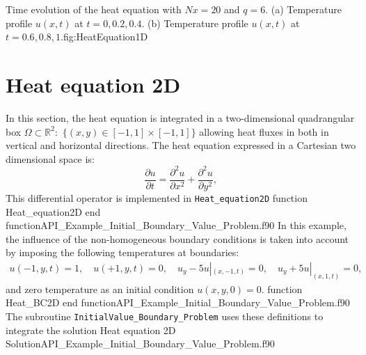 \twographs
{}
{}
{Time evolution of the heat equation with $ Nx = 20$ and  $q=6$. (a) Temperature profile $u(x,t)$ at $t=0, 0.2, 0.4$. (b) Temperature profile $u(x,t)$ at $t=0.6, 0.8, 1$.}{fig:HeatEquation1D}
   
      
  
\newpage      
\section{Heat equation 2D}
\vspace{-0.1cm}
In this section, the heat equation is integrated in a two-dimensional quadrangular box   $\Omega \subset \mathbb{R}^2 : $ $\{(x,y)\in  [-1,1]\times[-1,1]\}$ allowing heat fluxes in both in vertical and horizontal directions. The heat equation expressed in a Cartesian two dimensional space is: 
\begin{equation*}
       \frac{\partial u}{\partial t} =     \frac{\partial^2 u}{\partial x^2} + \frac{\partial^2 u}{\partial y^2},
\end{equation*}
This differential operator is implemented in \verb|Heat_equation2D|
\vspace{0.2cm}
{function Heat_equation2D}
{end function}{API_Example_Initial_Boundary_Value_Problem.f90}
In this example, the influence of the non-homogeneous boundary conditions is taken into account by imposing the following temperatures at boundaries: 
    \begin{align*}      	
        u(-1, y, t)=1, \quad u(+1, y, t)=0, \quad  u_y - 5 u|_{(x,-1,t)} = 0, \quad   u_y + 5 u| _{(x,1,t)} = 0,
      \end{align*}
and zero temperature as an initial condition $ u(x,y,0) = 0$. 
\vspace{0.2cm}  
{function Heat_BC2D}
{end function}{API_Example_Initial_Boundary_Value_Problem.f90}
The subroutine \verb|InitialValue_Boundary_Problem| uses these definitions to integrate the solution
\vspace{0.2cm} 
{Heat equation 2D}
{Solution}{API_Example_Initial_Boundary_Value_Problem.f90}
              
